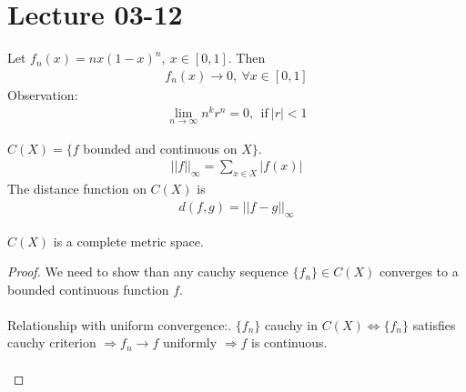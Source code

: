 \documentclass[class=scrartcl, crop=false]{standalone}
\date{2020-03-12}
\begin{document}
\section{Lecture 03-12}

\begin{example}
  Let $f_n(x) = nx(1 - x)^n, \ x \in [0, 1]$. Then
  \begin{gather*}
    f_n(x) \to 0, \ \forall x \in [0, 1]
  \end{gather*} 
  Observation:
  \begin{gather*}
    \lim_{n \to \infty}n^kr^n = 0, \ \ \text{if} \ |r| < 1
  \end{gather*} 
\end{example} 

\begin{recall}
  $C(X) = \{f$ bounded and continuous on $X \}$.
  \begin{gather*}
    ||f||_\infty = \sum_{x \in X}|f(x)|
  \end{gather*} 
  The distance function on $C(X)$ is 
  \begin{gather*}
    d(f, g) = ||f - g||_\infty
  \end{gather*} 
\end{recall} 

\begin{corollary}
  $C(X)$ is a complete metric space. 

  \begin{proof}
    We need to show than any cauchy sequence $\{f_n\} \in C(X)$ converges to a bounded continuous function $f$. 
    \\\\
    Relationship with uniform convergence:. $\{f_n\}$ cauchy in $C(X) \Leftrightarrow \{f_n\}$ satisfies cauchy criterion $\Rightarrow f_n \to f$ uniformly $\Rightarrow f$ is continuous. %
    \\\\
  \end{proof} 
\end{corollary} 
\end{document}
